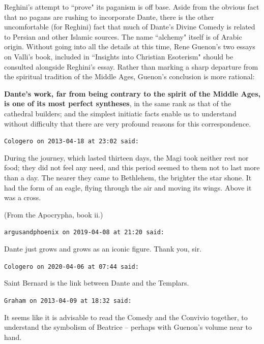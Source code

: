 \begin{footnotesize}
\begin{sffamily}
Reghini's attempt to ``prove" its paganism is off base. Aside from the obvious fact that no pagans are rushing to incorporate Dante, there is the other uncomfortable (for Reghini) fact that much of Dante's Divine Comedy is related to Persian and other Islamic sources. The name ``alchemy" itself is of Arabic origin. Without going into all the details at this time, Rene Guenon's two essays on Valli's book, included in ``Insights into Christian Esoterism" should be consulted alongside Reghini's essay. Rather than marking a sharp departure from the spiritual tradition of the Middle Ages, Guenon's conclusion is more rational:

\begin{quotex}
\textbf{Dante's work, far from being contrary to the spirit of the Middle Ages, is one of its most perfect syntheses}, in the same rank as that of the cathedral builders; and the simplest initiatic facts enable us to understand without difficulty that there are very profound reasons for this correspondence. 

\end{quotex}

\hfill

\texttt{Cologero on 2013-04-18 at 23:02 said: }

\begin{quotex}
During the journey, which lasted thirteen days, the Magi took neither rest nor food; they did not feel any need, and this period seemed to them not to last more than a day. The nearer they came to Bethlehem, the brighter the star shone. It had the form of an eagle, flying through the air and moving its wings. Above it was a cross.

\end{quotex}
(From the Apocrypha, book ii.)


\hfill

\texttt{argusandphoenix on 2019-04-08 at 21:20 said: }

Dante just grows and grows as an iconic figure. Thank you, sir.


\hfill

\texttt{Cologero on 2020-04-06 at 07:44 said: }

Saint Bernard is the link between Dante and the Templars.


\hfill

\texttt{Graham on 2013-04-09 at 18:32 said: }

It seems like it is advisable to read the Comedy and the Convivio together, to understand the symbolism of Beatrice – perhaps with Guenon's volume near to hand.


\end{sffamily}
\end{footnotesize}

